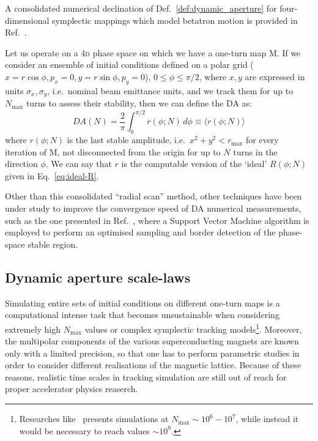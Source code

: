 A consolidated numerical declination of Def.~\ref{def:dynamic_aperture} for four-dimensional symplectic mappings which model betatron motion is provided in Ref.~\cite{todesco1996dynamic}.

Let us operate on a 4\textsc{d} phase space on which we have a one-turn map \(\mathrm{M}\). If we consider an ensemble of initial conditions defined on a polar grid (\(x=r\cos\phi, p_x=0, y=r\sin\phi, p_y=0\)), \(0\leq\phi\leq\pi/2\), where \(x,y\) are expressed in units \(\sigma_x, \sigma_y\), i.e.\ nominal beam emittance units, and we track them for up to \(N_{\text{max}}\) turns to assess their stability, then we can define the DA as:
\begin{equation}
	DA(N) = \frac{2}{\pi}\int_0^{\pi/2} r(\phi;N)\,d\phi \equiv \langle r(\phi;N)\rangle
	\label{eq:dynamic_aperture_numerical}
\end{equation}
where \(r(\phi;N)\) is the last stable amplitude, i.e.\ \(x^2 + y^2 < r_{\mathrm{max}}\) for every iteration of \(\mathrm{M}\), not disconnected from the origin for up to \(N\) turns in the direction \(\phi\). We can say that \(r\) is the computable version of the `ideal' \(R(\phi;N)\) given in Eq.~\eqref{eq:ideal-R}.

Other than this consolidated ``radial scan'' method, other techniques have been under study to improve the convergence speed of DA numerical measurements, such as the one presented in Ref.~\cite{}, where a Support Vector Machine algorithm is employed to perform an optimised sampling and border detection of the phase-space stable region.

\subsection{Dynamic aperture scale-laws}

Simulating entire sets of initial conditions on different one-turn maps is a computational intense task that becomes unsustainable when considering extremely high \(N_{\text{max}}\) values or complex symplectic tracking models\footnote{Researches like~\cite{giovannozzi1998dynamic} presents simulations at \(N_{\text{max}}\sim 10^6-10^7\), while instead it would be necessary to reach values \(\sim 10^9\).}. Moreover, the multipolar components of the various superconducting magnets are known only with a limited precision, so that one has to perform parametric studies in order to consider different realisations of the magnetic lattice. Because of these reasons, realistic time scales in tracking simulation are still out of reach for proper accelerator physics reaserch.

